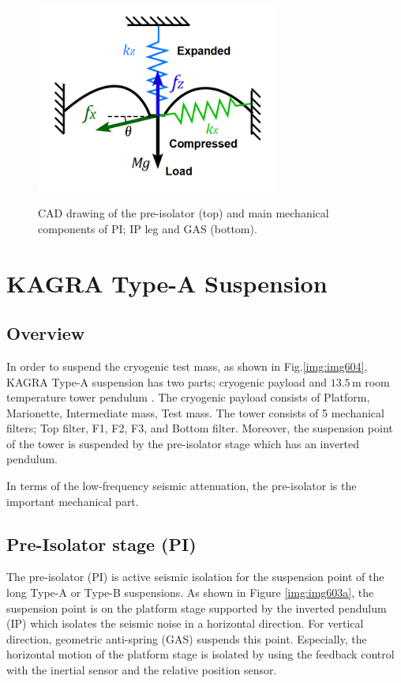 \begin{figure}[p]
\begin{minipage}[b]{0.5\hsize}
\begin{center}
      \label{img:img603b}
    \end{center}
  \end{minipage}
  \begin{minipage}[b]{0.5\hsize}
    \begin{center}
      \includegraphics[width=8cm]{./img_chap6/img603c.png}
      \label{img:img603b}
    \end{center}
  \end{minipage}  
  \caption{CAD drawing of the pre-isolator (top) and main mechanical components of PI; IP leg and GAS (bottom).}
\end{figure}


\section{KAGRA Type-A Suspension}
\subsection{Overview}
In order to suspend the cryogenic test mass, as shown in Fig.\ref{img:img604}, KAGRA Type-A suspension has two parts; cryogenic payload and $13.5\,\mathrm{m}$ room temperature tower pendulum \cite{Okutomi2019development}. The cryogenic payload consists of Platform, Marionette, Intermediate mass, Test mass. The tower consists of 5 mechanical filters; Top filter, F1, F2, F3, and Bottom filter. Moreover, the suspension point of the tower is suspended by the pre-isolator stage which has an inverted pendulum.

In terms of the low-frequency seismic attenuation, the pre-isolator is the important mechanical part.



\subsection{Pre-Isolator stage (PI)}
The pre-isolator (PI) is active seismic isolation for the suspension point of the long Type-A or Type-B suspensions. As shown in Figure \ref{img:img603a}, the suspension point is on the platform stage supported by the inverted pendulum (IP) which isolates the seismic noise in a horizontal direction. For vertical direction, geometric anti-spring (GAS) suspends this point. Especially, the horizontal motion of the platform stage is isolated by using the feedback control with the inertial sensor and the relative position sensor.

